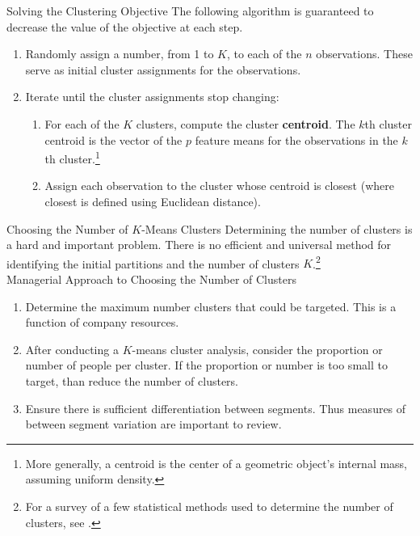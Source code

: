 \documentclass[pdf]{beamer}
\newcommand{\empr}[1]{{\color{franklinblue}\textbf{#1}}}
\theoremstyle{remark}
\theoremstyle{definition}
\begin{document}
\begin{frame}[t]{Solving the Clustering Objective}
The following algorithm is guaranteed to decrease the value of the objective
at each step. \\
\vspace{1.5ex}
\begin{enumerate}
\item Randomly assign a number, from 1 to $K$, to each of the $n$ observations. These serve as initial cluster assignments for the observations.
\item Iterate until the cluster assignments stop changing:
\begin{enumerate} 
  \item For each of the $K$ clusters, compute the cluster \empr{centroid}. The $k$th cluster centroid is the vector of the $p$ feature means for the observations in the $k$th cluster.\footnote{More generally, a centroid is the center of a geometric object's internal mass, assuming uniform density.}
  \item  Assign each observation to the cluster whose centroid is closest (where closest is defined using Euclidean distance).
\end{enumerate}
\end{enumerate} 
\end{frame}

\begin{frame}[t]{Choosing the Number of $K$-Means Clusters}
Determining the number of clusters is a hard and important problem.  There is no efficient and universal method for identifying the initial partitions and the number of clusters $K$.\footnote{For a survey of a few statistical methods used to determine the number of clusters, see \cite{chiang2010}.}\\
\vspace{1.5ex}
Managerial Approach to Choosing the Number of Clusters \\
\vspace{0.0ex}
\small
\begin{enumerate}
  \item  Determine the maximum number clusters that could be targeted.  This is a function of company resources. 
  \item  After conducting a $K$-means cluster analysis, consider the proportion or number of people per cluster.  If the proportion or number is too small to target, than reduce the number of clusters.  
  \item Ensure there is sufficient differentiation between segments.  Thus measures of between segment variation are important to review.   
\end{enumerate}
\end{frame}
\end{document}
